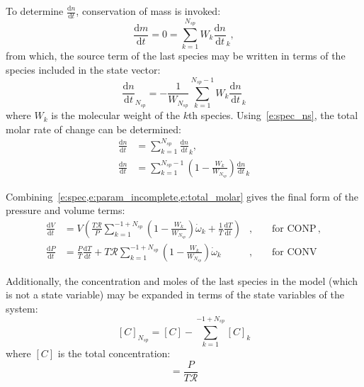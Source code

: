 \documentclass[12pt]{article}
\newcommand{\ns}{\ensuremath{{N_{sp}}}}
\newcommand{\conp}{CONP}
\newcommand{\conv}{CONV}
\newcommand{\dconp}{\ensuremath{,\qquad\text{for \conp}}}
\newcommand{\dconv}{\ensuremath{,\qquad\text{for \conv}}}
\newcommand{\Ru}{\ensuremath{\mathcal{R}}}
\begin{document}
To determine $\frac{\text{d} n }{\text{d} t }$, conservation of mass is invoked:
\begin{equation}
 \frac{\text{d} m }{\text{d} t } = 0 = \sum_{k=1}^{\ns}  W_{k} \frac{\text{d} n }{\text{d} t }_{k},
\end{equation}
from which, the source term of the last species may be written in terms of the species included in the state vector:
\begin{equation}
 \frac{\text{d} n }{\text{d} t }_{\ns} = - \frac{1}{W_{\ns}} \sum_{k=1}^{\ns - 1} W_{k} \frac{\text{d} n }{\text{d} t }_{k}
 \label{e:spec_ns}
\end{equation}
where $W_{k}$ is the molecular weight of the $k$th species.
Using~\cref{e:spec_ns}, the total molar rate of change can be determined:
\begin{align}
\frac{\text{d} n }{\text{d} t } &= \sum_{k=1}^{\ns} \frac{\text{d} n }{\text{d} t }_{k}, \nonumber \\
\frac{\text{d} n }{\text{d} t } &= \sum_{k=1}^{\ns - 1} \left(1 - \frac{W_{k}}{W_{\ns}}\right) \frac{\text{d} n }{\text{d} t }_{k}
\label{e:total_molar}
\end{align}

Combining~\cref{e:spec,e:param_incomplete,e:total_molar} gives the final form of the pressure and volume terms:
\begin{subequations}
\label{e:param_complete}
\begin{align}
\frac{\text{d} V }{\text{d} t } &= V \left(\frac{T \Ru}{P} \sum_{k=1}^{-1 + \ns} \left(1 - \frac{W_{k}}{W_{\ns}}\right) \dot{\omega}_{k} + \frac{1}{T} \frac{\text{d} T }{\text{d} t }\right)&\dconp, \\
\frac{\text{d} P }{\text{d} t } &= \frac{P}{T} \frac{\text{d} T }{\text{d} t } + T \Ru \sum_{k=1}^{-1 + \ns} \left(1 - \frac{W_{k}}{W_{\ns}}\right) \dot{\omega}_{k}&\dconv
\end{align}
\end{subequations}

Additionally, the concentration and moles of the last species in the model (which is not a state variable) may be expanded in terms of the state variables of the system:
\begin{equation}
 \label{e:last_spec_conc}
   [C]_{\ns} = [C] - \sum_{k=1}^{-1 + \ns} [C]_{k}
\end{equation}
where $[C]$ is the total concentration:
\begin{equation}
 [C] = \frac{P}{T \Ru}
\end{equation}
\end{document}
